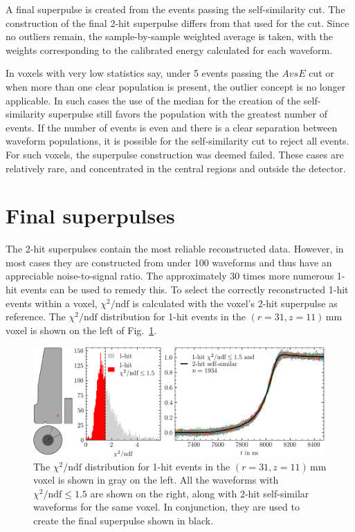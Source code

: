 A final superpulse is created from the events passing the self-similarity cut. The construction of the final 2-hit superpulse differs from that used for the cut. Since no outliers remain, the sample-by-sample weighted average is taken, with the weights corresponding to the calibrated energy calculated for each waveform. 

In voxels with very low statistics say, under 5 events passing the $AvsE$ cut or when more than one clear population is present, the outlier concept is no longer applicable. In such cases the use of the median for the creation of the self-similarity superpulse still favors the population with the greatest number of events. If the number of events is even and there is a clear separation between waveform populations, it is possible for the self-similarity cut to reject all events. For such voxels, the superpulse construction was deemed failed. These cases are relatively rare, and concentrated in the central regions and outside the detector.

\section{Final superpulses}

The 2-hit superpulses contain the most reliable reconstructed data. However, in most cases they are constructed from under 100 waveforms and thus have an appreciable noise-to-signal ratio. The approximately 30 times more numerous 1-hit events can be used to remedy this. To select the correctly reconstructed 1-hit events within a voxel, $\chi^2/\text{ndf}$ is calculated with the voxel's 2-hit superpulse as reference. The $\chi^2/\text{ndf}$ distribution for 1-hit events in the $(r = 31, z = 11)$\,mm voxel is shown on the left of Fig.~\ref{fig:Cs_superpulse_final}.
\begin{figure}[htb]
    \centering
    \includegraphics[width=6in]{figs/pipeline/Cs_superpulse_final.png}
    \caption{The $\chi^2/\text{ndf}$ distribution for 1-hit events in the $(r = 31, z = 11)$\,mm voxel is shown in gray on the left. All the waveforms with $\chi^2/\text{ndf} \le 1.5$ are shown on the right, along with 2-hit self-similar waveforms for the same voxel. In conjunction, they are used to create the final superpulse shown in black.}
    \label{fig:Cs_superpulse_final}
\end{figure}

